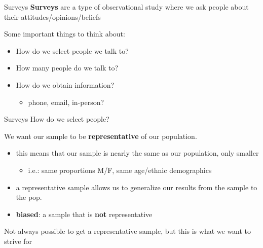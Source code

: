\documentclass{beamer}
\begin{document}
\begin{frame}{Surveys}
\textbf{Surveys} are a type of observational study where we ask people about their attitudes/opinions/beliefs \vspace{4mm}

Some important things to think about:
\begin{itemize}
    \item How do we select people we talk to?
    \item How many people do we talk to?
    \item How do we obtain information?
        \begin{itemize}
            \item phone, email, in-person?
        \end{itemize}
\end{itemize}
\end{frame}



\begin{frame}{Surveys}
How do we select people? \vspace{6mm}

We want our sample to be \textbf{representative} of our population.
\begin{itemize}
    \item this means that our sample is nearly the same as our population, only smaller
        \begin{itemize}
            \item i.e.: same proportions M/F, same age/ethnic demographics
        \end{itemize}
    \item a representative sample allows us to generalize our results from the sample to the pop.
    \item \textbf{biased}: a sample that is \textbf{not} representative
\end{itemize} \vspace{4mm}

Not always possible to get a representative sample, but this is what we want to strive for
\end{frame}
\end{document}
